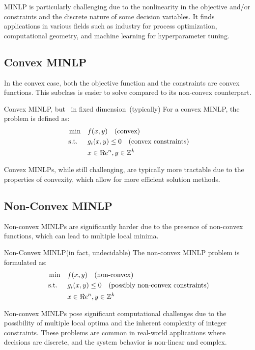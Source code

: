MINLP is particularly challenging due to the nonlinearity in the objective and/or constraints and the discrete nature of some decision variables. It finds applications in various fields such as industry for process optimization, computational geometry, and machine learning for hyperparameter tuning.

\subsection{Convex MINLP}
In the convex case, both the objective function and the constraints are convex functions. This subclass is easier to solve compared to its non-convex counterpart.
\begin{general}{Convex MINLP}{\nphard, but \polynomial\ in fixed dimension\  (typically)}
For a convex MINLP, the problem is defined as:
\begin{equation}
\label{eq:convex-minlp}
\begin{split}
\min \quad & f(x, y) \quad \mbox{(convex)}\\
\mbox{ s.t. }  \quad & g_i(x, y) \leq 0  \quad  \mbox{(convex constraints)}\\
           & x \in \Re e^n, y \in {\mathbb{Z}}^k
\end{split}
\end{equation}
\end{general}
Convex MINLPs, while still challenging, are typically more tractable due to the properties of convexity, which allow for more efficient solution methods.

\subsection{Non-Convex MINLP}
Non-convex MINLPs are significantly harder due to the presence of non-convex functions, which can lead to multiple local minima.
\begin{general}{Non-Convex MINLP}{\nphard (in fact, undecidable)}
The non-convex MINLP problem is formulated as:
\begin{equation}
\label{eq:nonconvex-minlp}
\begin{split}
\min \quad & f(x, y) \quad
\mbox{(non-convex)}\\
\mbox{ s.t. } \quad & g_i(x, y) \leq 0 \quad \mbox{(possibly non-convex constraints)}\\
& x \in \Re e^n, y \in {\mathbb{Z}}^k
\end{split}
\end{equation}
\end{general}
Non-convex MINLPs pose significant computational challenges due to the possibility of multiple local optima and the inherent complexity of integer constraints. These problems are common in real-world applications where decisions are discrete, and the system behavior is non-linear and complex.

